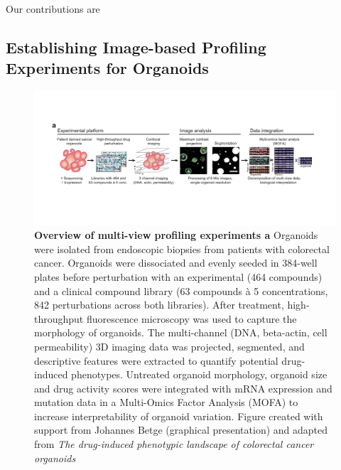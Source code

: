 \begin{flushleft}
Our contributions are

\subsection{Establishing Image-based Profiling Experiments for Organoids}


\begin{figure}[h]
\centering
\includegraphics[width=\textwidth,
                height=\textheight,
                keepaspectratio]{figures/promise/pdf/fig_1_1.pdf}
\caption[Overview of multi-view profiling experiments]{\textbf{Overview of multi-view profiling experiments a} Organoids were isolated from endoscopic biopsies from patients with colorectal cancer. Organoids were dissociated and evenly seeded in 384-well plates before perturbation with an experimental (464 compounds) and a clinical compound library (63 compounds à 5 concentrations, 842 perturbations across both libraries). After treatment, high-throughput fluorescence microscopy was used to capture the morphology of organoids.  The multi-channel (DNA, beta-actin, cell permeability) 3D imaging data was projected, segmented, and descriptive features were extracted to quantify potential drug-induced phenotypes. Untreated organoid morphology, organoid size and drug activity scores were integrated with mRNA expression and mutation data in a Multi-Omics Factor Analysis (MOFA) to increase interpretability of organoid variation. Figure created with support from Johannes Betge (graphical presentation) and adapted from \textit{The drug-induced phenotypic landscape of colorectal cancer organoids} \citep{Betge2022-kr}}
\label{fig_130}
\end{figure}


\end{flushleft}
